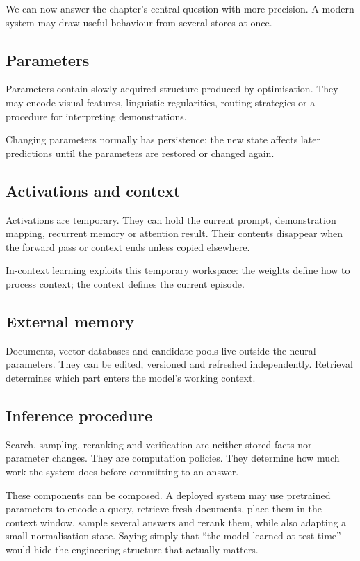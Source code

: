 We can now answer the chapter's central question with more precision. A modern system may draw useful behaviour from several stores at once.

\subsection{Parameters}

Parameters contain slowly acquired structure produced by optimisation. They may encode visual features, linguistic regularities, routing strategies or a procedure for interpreting demonstrations.

Changing parameters normally has persistence: the new state affects later predictions until the parameters are restored or changed again.

\subsection{Activations and context}

Activations are temporary. They can hold the current prompt, demonstration mapping, recurrent memory or attention result. Their contents disappear when the forward pass or context ends unless copied elsewhere.

In-context learning exploits this temporary workspace: the weights define how to process context; the context defines the current episode.

\subsection{External memory}

Documents, vector databases and candidate pools live outside the neural parameters. They can be edited, versioned and refreshed independently. Retrieval determines which part enters the model's working context.

\subsection{Inference procedure}

Search, sampling, reranking and verification are neither stored facts nor parameter changes. They are computation policies. They determine how much work the system does before committing to an answer.

These components can be composed. A deployed system may use pretrained parameters to encode a query, retrieve fresh documents, place them in the context window, sample several answers and rerank them, while also adapting a small normalisation state. Saying simply that ``the model learned at test time'' would hide the engineering structure that actually matters.

